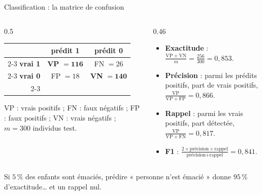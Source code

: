 \documentclass[aspectratio=169,11pt]{beamer}
\begin{document}
\begin{frame}{Classification : la matrice de confusion}
  \begin{columns}[T]
    \begin{column}{0.5\textwidth}
      \centering
      \renewcommand{\arraystretch}{1.7}
      \begin{tabular}{r|c|c|}
        \multicolumn{1}{r}{} & \multicolumn{1}{c}{\textbf{prédit 1}} & \multicolumn{1}{c}{\textbf{prédit 0}} \\ \cline{2-3}
        \textbf{vrai 1} & \textbf{VP} $\boldsymbol{=116}$ & FN $=26$ \\ \cline{2-3}
        \textbf{vrai 0} & FP $=18$ & \textbf{VN} $\boldsymbol{=140}$ \\ \cline{2-3}
      \end{tabular}
      \vskip2mm
      \begin{minipage}{0.92\linewidth}\raggedright\scriptsize\color{cnfGris}
        VP : vrais positifs ; FN : faux négatifs ; FP : faux positifs ; VN : vrais négatifs ; $m=300$ individus test.
      \end{minipage}
    \end{column}
    \begin{column}{0.46\textwidth}
      \small
      \begin{itemize}
        \item \textbf{Exactitude} : $\frac{\mathrm{VP}+\mathrm{VN}}{m}=\frac{256}{300}=0{,}853$.
        \item \textbf{Précision} : parmi les prédits positifs, part de vrais positifs, $\frac{\mathrm{VP}}{\mathrm{VP}+\mathrm{FP}}=0{,}866$.
        \item \textbf{Rappel} : parmi les vrais positifs, part détectée, $\frac{\mathrm{VP}}{\mathrm{VP}+\mathrm{FN}}=0{,}817$.
        \item \textbf{F1} : $\frac{2\times\text{précision}\times\text{rappel}}{\text{précision}+\text{rappel}}=0{,}841$.
      \end{itemize}
    \end{column}
  \end{columns}
  \vskip2mm
  \begin{remarque}
    Si $5\,\%$ des enfants sont émaciés, prédire « personne n'est émacié » donne $95\,\%$ d'exactitude\dots{} et un rappel nul.
  \end{remarque}
\end{frame}
\end{document}
